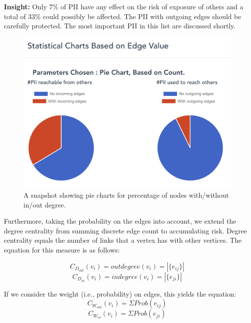 \documentclass[conference]{IEEEtran}
\begin{document}
{\bf Insight:} Only 7\% of PII have any effect on the risk of exposure of others and a total of 33\% could possibly be affected. The PII with outgoing edges should be carefully protected. The most important PII in this list are discussed shortly.

\begin{figure}[ht!]
  \includegraphics[width=\linewidth]{pie_PII.png}
  \caption{A snapshot showing pie charts for percentage of nodes with/without in/out degree.}
  \label{fig:pie_pii}
\end{figure}


 Furthermore, taking the probability on the edges into account, we extend the degree centrality from summing discrete edge count to accumulating risk.
Degree centrality equals the number of links that a vertex has with other vertices. The equation for this measure is as follows: 

\begin{equation}
C_{D_{out}}(v_i) = outdegree(v_{i}) = |\{e_{ij}\}|
\end{equation}
\begin{equation}
C_{D_{in}}(v_i) = indegree(v_{i}) = |\{e_{ji}\}|
\end{equation}

If we consider the weight (i.e., probability) on edges, this yields the equation:
\begin{equation}
C_{W_{out}}(v_i) = \Sigma Prob(e_{ij})
\end{equation}
\begin{equation}
C_{W_{in}}(v_i) = \Sigma Prob(e_{ji})
\end{equation}
\end{document}
